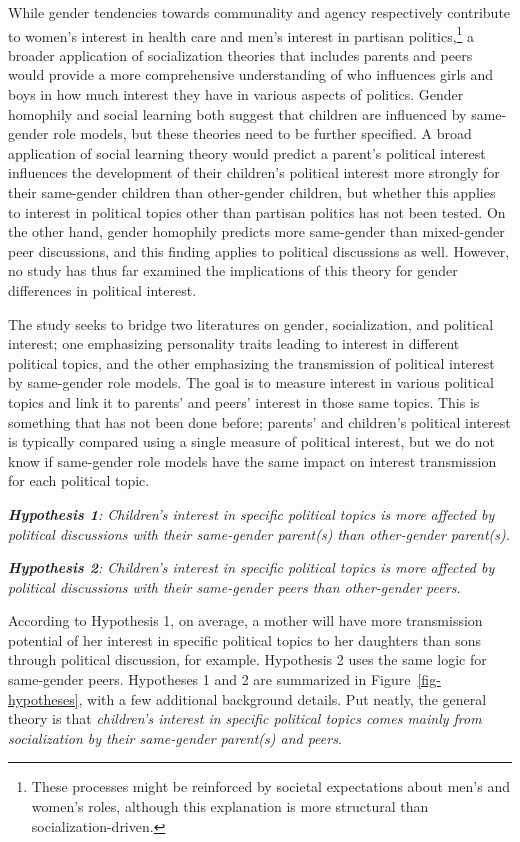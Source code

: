 \documentclass[
  letterpaper,
  DIV=11,
  numbers=noendperiod]{scrreprt}
\begin{document}
While gender tendencies towards communality and agency respectively
contribute to women's interest in health care and men's interest in
partisan politics,\footnote{These processes might be reinforced by
  societal expectations about men's and women's roles, although this
  explanation is more structural than socialization-driven.} a broader
application of socialization theories that includes parents and peers
would provide a more comprehensive understanding of who influences girls
and boys in how much interest they have in various aspects of politics.
Gender homophily and social learning both suggest that children are
influenced by same-gender role models, but these theories need to be
further specified. A broad application of social learning theory would
predict a parent's political interest influences the development of
their children's political interest more strongly for their same-gender
children than other-gender children, but whether this applies to
interest in political topics other than partisan politics has not been
tested. On the other hand, gender homophily predicts more same-gender
than mixed-gender peer discussions, and this finding applies to
political discussions as well. However, no study has thus far examined
the implications of this theory for gender differences in political
interest.

The study seeks to bridge two literatures on gender, socialization, and
political interest; one emphasizing personality traits leading to
interest in different political topics, and the other emphasizing the
transmission of political interest by same-gender role models. The goal
is to measure interest in various political topics and link it to
parents' and peers' interest in those same topics. This is something
that has not been done before; parents' and children's political
interest is typically compared using a single measure of political
interest, but we do not know if same-gender role models have the same
impact on interest transmission for each political topic.

\emph{\textbf{Hypothesis 1}: Children's interest in specific political
topics is more affected by political discussions with their same-gender
parent(s) than other-gender parent(s).}

\emph{\textbf{Hypothesis 2}: Children's interest in specific political
topics is more affected by political discussions with their same-gender
peers than other-gender peers.}

According to Hypothesis 1, on average, a mother will have more
transmission potential of her interest in specific political topics to
her daughters than sons through political discussion, for example.
Hypothesis 2 uses the same logic for same-gender peers. Hypotheses 1 and
2 are summarized in Figure~\ref{fig-hypotheses}, with a few additional
background details. Put neatly, the general theory is that
\emph{children's interest in specific political topics comes mainly from
socialization by their same-gender parent(s) and peers}.
\end{document}
